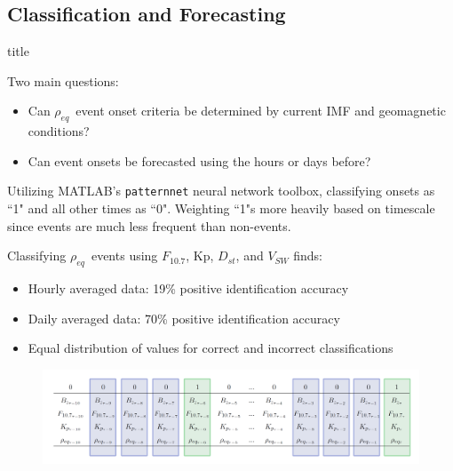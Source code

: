\documentclass[xcolor={dvipsnames,table}]{beamer}
\newcommand{\subheader}{    		\begin{center}
  	\begin{beamercolorbox}[sep=4pt,center,shadow=true,rounded=true]{title}
  		\usebeamerfont{title}\subsecname\par%
  	\end{beamercolorbox}
  	\vfill
  	\end{center}}
\newcommand{\req}{\ensuremath{\rho_{eq}}} %
\newcommand{\dst}{\ensuremath{D_{st}}} %
\newcommand{\f}{\ensuremath{F_{10.7}}} %
\begin{document}
\subsection{Classification and Forecasting}
\begin{frame}
	\subheader
	Two main questions:
	\begin{itemize}
		\item Can \req\ event onset criteria be determined by current IMF and geomagnetic conditions?
		\item Can event onsets be forecasted using the hours or days before?
	\end{itemize}
	\vspace{1em}
	Utilizing MATLAB's \texttt{patternnet} neural network toolbox, classifying onsets as ``1" and all other times as ``0". Weighting ``1"s more heavily based on timescale since events are much less frequent than non-events.
\end{frame}


\begin{frame}
	Classifying \req\ events using \f, Kp, \dst, and $V_{SW}$ finds:
	\begin{itemize}
		\item Hourly averaged data: 19\% positive identification accuracy\\
		\item Daily averaged data: 70\% positive identification accuracy\\
		\item Equal distribution of values for correct and incorrect classifications
	\end{itemize}
	
		\begin{figure}[htp!]
			\centering
			\includegraphics[width=1\linewidth]{Figures/CH5/ClassifyGraphic-2.png}
		\end{figure}
\end{frame}
\end{document}
